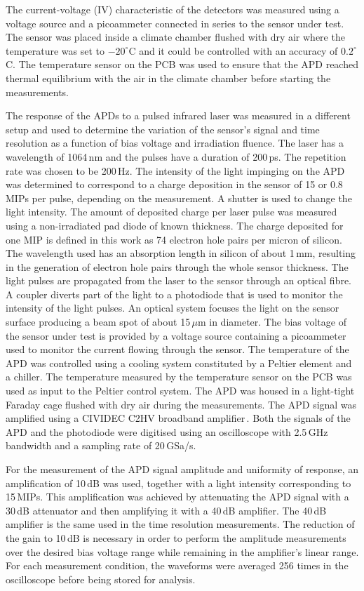 \documentclass[3p,preprint,twocolumn]{elsarticle}
\begin{document}
The current-voltage (IV) characteristic of the detectors was measured using a voltage source and a picoammeter connected in series to the sensor under test.
The sensor was placed inside a climate chamber flushed with dry air where the temperature was set to $-20^\circ$C and it could be controlled with an accuracy of $0.2^\circ$C.
The temperature sensor on the PCB was used to ensure that the APD reached thermal equilibrium with the air in the climate chamber before starting the measurements.

The response of the APDs to a pulsed infrared laser was measured in a different setup and used to determine the variation of the sensor's signal and time resolution as a function of bias voltage and irradiation fluence.
The laser has a wavelength of 1064\,nm and the pulses have a duration of 200\,ps.
The repetition rate was chosen to be 200\,Hz.
The intensity of the light impinging on the APD was determined to correspond to a charge deposition in the sensor of 15 or 0.8\,MIPs per pulse, depending on the measurement.
A shutter is used to change the light intensity.
The amount of deposited charge per laser pulse was measured using a non-irradiated pad diode of known thickness.
The charge deposited for one MIP is defined in this work as 74 electron hole pairs per micron of silicon.
The wavelength used has an absorption length in silicon of about 1\,mm, resulting in the generation of electron hole pairs through the whole sensor thickness.
The light pulses are propagated from the laser to the sensor through an optical fibre.
A coupler diverts part of the light to a photodiode that is used to monitor the intensity of the light pulses.
An optical system focuses the light on the sensor surface producing a beam spot of about 15\,$\mu$m in diameter.
The bias voltage of the sensor under test is provided by a voltage source containing a picoammeter used to monitor the current flowing through the sensor.
The temperature of the APD was controlled using a cooling system constituted by a Peltier element and a chiller.
The temperature measured by the temperature sensor on the PCB was used as input to the Peltier control system.
The APD was housed in a light-tight Faraday cage flushed with dry air during the measurements.
The APD signal was amplified using a CIVIDEC C2HV broadband amplifier\,\cite{cividec}.
Both the signals of the APD and the photodiode were digitised using an oscilloscope with 2.5\,GHz bandwidth and a sampling rate of 20\,GSa/s.

For the measurement of the APD signal amplitude and uniformity of response, an amplification of 10\,dB was used, together with a light intensity corresponding to 15\,MIPs.
This amplification was achieved by attenuating the APD signal with a 30\,dB attenuator and then amplifying it with a 40\,dB amplifier.
The 40\,dB amplifier is the same used in the time resolution measurements.
The reduction of the gain to 10\,dB is necessary in order to perform the amplitude measurements over the desired bias voltage range while remaining in the amplifier's linear range.
For each measurement condition, the waveforms were averaged 256 times in the oscilloscope before being stored for analysis.
\end{document}
